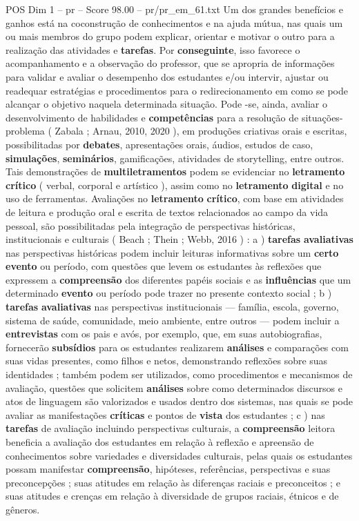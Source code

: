 \begin{textsample}{POS Dim 1 – pr – Score 98.00 – pr/pr\_em\_61.txt}
Um dos grandes benefícios e ganhos está na coconstrução de conhecimentos e na ajuda mútua, nas quais um ou mais membros do grupo podem explicar, orientar e motivar o outro para a realização das atividades e \textbf{tarefas}.
Por \textbf{conseguinte}, isso favorece o acompanhamento e a observação do professor, que se apropria de informações para validar e avaliar o desempenho dos estudantes e/ou intervir, ajustar ou readequar estratégias e procedimentos para o redirecionamento em como se pode alcançar o objetivo naquela determinada situação.
Pode -se, ainda, avaliar o desenvolvimento de habilidades e \textbf{competências} para a resolução de situações-problema ( Zabala ; Arnau, 2010, 2020 ), em produções criativas orais e escritas, possibilitadas por \textbf{debates}, apresentações orais, áudios, estudos de caso, \textbf{simulações}, \textbf{seminários}, gamificações, atividades de storytelling, entre outros.
Tais demonstrações de \textbf{multiletramentos} podem se evidenciar no \textbf{letramento} \textbf{crítico} ( verbal, corporal e artístico ), assim como no \textbf{letramento} \textbf{digital} e no uso de ferramentas.
Avaliações no \textbf{letramento} \textbf{crítico}, com base em atividades de leitura e produção oral e escrita de textos relacionados ao campo da vida pessoal, são possibilitadas pela integração de perspectivas históricas, institucionais e culturais ( Beach ; Thein ; Webb, 2016 ) : a ) \textbf{tarefas} \textbf{avaliativas} nas perspectivas históricas podem incluir leituras informativas sobre um \textbf{certo} \textbf{evento} ou período, com questões que levem os estudantes às reflexões que expressem a \textbf{compreensão} dos diferentes papéis sociais e as \textbf{influências} que um determinado \textbf{evento} ou período pode trazer no presente contexto social ; b ) \textbf{tarefas} \textbf{avaliativas} nas perspectivas institucionais — família, escola, governo, sistema de saúde, comunidade, meio ambiente, entre outros — podem incluir a \textbf{entrevistas} com os pais e avós, por exemplo, que, em suas autobiografias, fornecerão \textbf{subsídios} para os estudantes realizarem \textbf{análises} e comparações com suas vidas presentes, como filhos e netos, demonstrando reflexões sobre suas identidades ; também podem ser utilizados, como procedimentos e mecanismos de avaliação, questões que solicitem \textbf{análises} sobre como determinados discursos e atos de linguagem são valorizados e usados dentro dos sistemas, nas quais se pode avaliar as manifestações \textbf{críticas} e pontos de \textbf{vista} dos estudantes ; c ) nas \textbf{tarefas} de avaliação incluindo perspectivas culturais, a \textbf{compreensão} leitora beneficia a avaliação dos estudantes em relação à reflexão e apreensão de conhecimentos sobre variedades e diversidades culturais, pelas quais os estudantes possam manifestar \textbf{compreensão}, hipóteses, referências, perspectivas e suas preconcepções ; suas atitudes em relação às diferenças raciais e preconceitos ; e suas atitudes e crenças em relação à diversidade de grupos raciais, étnicos e de gêneros.

\end{textsample}
